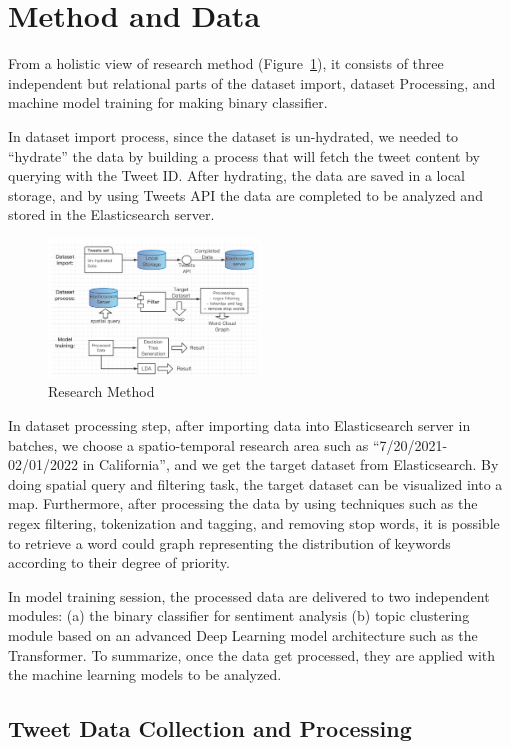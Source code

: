 \section{Method and Data} \label{sec:method_and_data}
From a holistic view of research method (Figure~\ref{fig:Research Method}), it
consists of three independent but relational parts of the dataset import,
dataset Processing, and machine model training for making binary classifier.

In dataset import process, since the dataset is un-hydrated, we needed
to “hydrate” the data by building a process that will fetch the tweet content
by querying with the Tweet ID. After hydrating, the data are saved in a local
storage, and by using Tweets API the data are completed to be analyzed and
stored in the Elasticsearch server. 
\begin{figure}[h]
\centering
\includegraphics[width=0.5\textwidth]{imgs/Research_Method.png}
\caption{Research Method}
\label{fig:Research Method}
\end{figure}
In dataset processing step, after importing data into Elasticsearch server in
batches, we choose a spatio-temporal research area such
as “7/20/2021-02/01/2022 in California”, and we get the target dataset from
Elasticsearch. By doing spatial query and filtering task, the target dataset
can be visualized into a map. Furthermore, after processing the data by using
techniques such as the regex filtering, tokenization and tagging, and
removing stop words, it is possible to retrieve a word could graph
representing the distribution of keywords according to their degree of
priority.

In model training session, the processed data are delivered to two independent
modules: (a) the binary classifier for sentiment analysis (b) topic
clustering module based on an advanced Deep Learning model architecture such
as the Transformer. To summarize, once the data get processed, they are
applied with the machine learning models to be analyzed.

\subsection{Tweet Data Collection and Processing}

